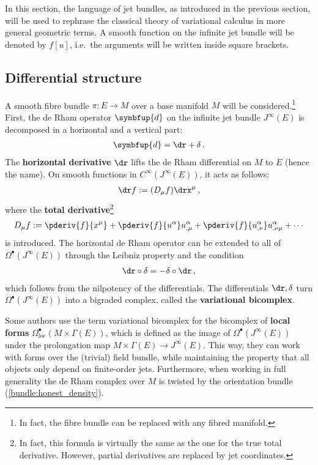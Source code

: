\section{}\label{section:variational_bicomplex}

    In this section, the language of jet bundles, as introduced in the previous section, will be used to rephrase the classical theory of variational calculus in more general geometric terms. A smooth function on the infinite jet bundle will be denoted by $f[u]$, i.e.~the arguments will be written inside square brackets.

\subsection{Differential structure}

    A smooth fibre bundle $\pi:E\rightarrow M$ over a base manifold $M$ will be considered.\footnote{In fact, the fibre bundle can be replaced with any fibred manifold.} First, the de Rham operator $\symbfup{d}$ on the infinite jet bundle $J^\infty(E)$ is decomposed in a horizontal and a vertical part:
    \begin{gather}
        \symbfup{d} = \dr+\delta\,.
    \end{gather}
    The \textbf{horizontal derivative} $\dr$ lifts the de Rham differential on $M$ to $E$ (hence the name). On smooth functions in $C^\infty(J^\infty(E))$, it acts as follows:
    \begin{gather}
        \dr f := (D_\mu f)\drx^\mu\,,
    \end{gather}
    where the \textbf{total derivative}\footnote{In fact, this formula is virtually the same as the one for the true total derivative. However, partial derivatives are replaced by jet coordinates.}
    \begin{gather}
        D_\mu f := \pderiv{f}{x^\mu} + \pderiv{f}{u^\alpha}u^\alpha_{,\mu} + \pderiv{f}{u^\alpha_{,\nu}}u^\alpha_{,\nu\mu} + \cdots
    \end{gather}
    is introduced. The horizontal de Rham operator can be extended to all of $\Omega^\bullet(J^\infty(E))$ through the Leibniz property and the condition
    \begin{gather}
        \dr\circ\delta = -\delta\circ\dr\,,
    \end{gather}
    which follows from the nilpotency of the differentials. The differentials $\dr,\delta$ turn $\Omega^\bullet(J^\infty(E))$ into a bigraded complex, called the \textbf{variational bicomplex}.
    \begin{remark}
        Some authors use the term variational bicomplex for the bicomplex of \textbf{local forms} $\Omega^\bullet_\mathrm{loc}(M\times\Gamma(E))$, which is defined as the image of $\Omega^\bullet(J^\infty(E))$ under the prolongation map $M\times\Gamma(E)\rightarrow J^\infty(E)$. This way, they can work with forms over the (trivial) field bundle, while maintaining the property that all objects only depend on finite-order jets. Furthermore, when working in full generality the de Rham complex over $M$ is twisted by the orientation bundle (\cref{bundle:honest_density}).
    \end{remark}

